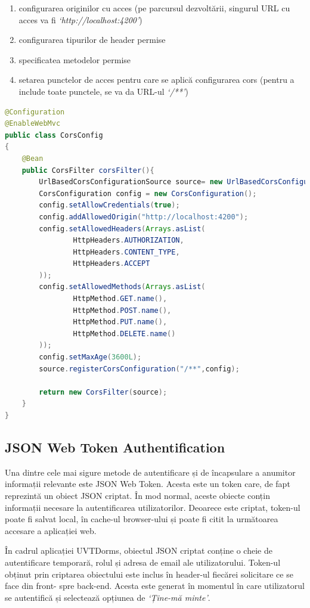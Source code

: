 \documentclass[12pt,a4paper]{report}
\theoremstyle{definition}
\theoremstyle{remark}
\begin{document}
\begin{enumerate}
    \item configurarea originilor cu acces (pe parcursul dezvoltării, singurul URL cu acces va fi \textit{`http://localhost:4200'})
    \item configurarea tipurilor de header permise
    \item specificatea metodelor permise
    \item setarea punctelor de acces pentru care se aplică configurarea cors (pentru a include toate punctele, se va da URL-ul \textit{`/**'})
\end{enumerate}

\begin{lstlisting}[language=Java, caption={Clasa prin care se realizează configurarea CORS}]
@Configuration
@EnableWebMvc
public class CorsConfig
{
    @Bean
    public CorsFilter corsFilter(){
        UrlBasedCorsConfigurationSource source= new UrlBasedCorsConfigurationSource();
        CorsConfiguration config = new CorsConfiguration();
        config.setAllowCredentials(true);
        config.addAllowedOrigin("http://localhost:4200");
        config.setAllowedHeaders(Arrays.asList(
                HttpHeaders.AUTHORIZATION,
                HttpHeaders.CONTENT_TYPE,
                HttpHeaders.ACCEPT
        ));
        config.setAllowedMethods(Arrays.asList(
                HttpMethod.GET.name(),
                HttpMethod.POST.name(),
                HttpMethod.PUT.name(),
                HttpMethod.DELETE.name()
        ));
        config.setMaxAge(3600L);
        source.registerCorsConfiguration("/**",config);

        return new CorsFilter(source);
    }
}
\end{lstlisting}

\subsection{JSON Web Token Authentification}
\par Una dintre cele mai sigure metode de autentificare și de încapsulare a anumitor informații relevante este JSON Web Token\cite{jones2015json}. Acesta este un token care, de fapt reprezintă un obiect JSON criptat. În mod normal, aceste obiecte conțin informații necesare la autentificarea utilizatorilor. Deoarece este criptat, token-ul poate fi salvat local, în cache-ul browser-ului și poate fi citit la următoarea accesare a aplicației web.

\par În cadrul aplicației UVTDorms, obiectul JSON criptat conține o cheie de autentificare temporară, rolul și adresa de email ale utilizatorului. Token-ul obținut prin criptarea obiectului este inclus în header-ul fiecărei solicitare ce se face din front- spre back-end. Acesta este generat în momentul în care utilizatorul se autentifică și selectează opțiunea de \textit{`Ține-mă minte'}.
\end{document}
